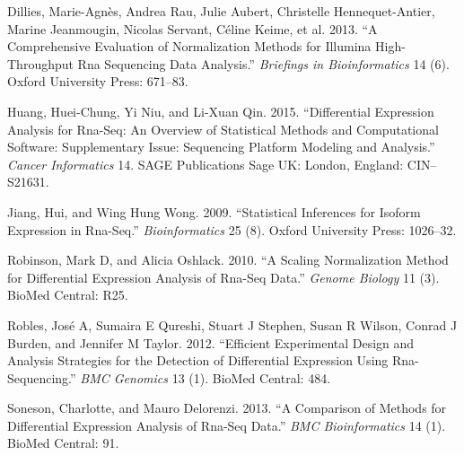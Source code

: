 \documentclass[]{article}
\begin{document}
\leavevmode\hypertarget{ref-dillies2013comprehensive}{}%
Dillies, Marie-Agnès, Andrea Rau, Julie Aubert, Christelle
Hennequet-Antier, Marine Jeanmougin, Nicolas Servant, Céline Keime, et
al. 2013. ``A Comprehensive Evaluation of Normalization Methods for
Illumina High-Throughput Rna Sequencing Data Analysis.'' \emph{Briefings
in Bioinformatics} 14 (6). Oxford University Press: 671--83.

\leavevmode\hypertarget{ref-huang2015differential}{}%
Huang, Huei-Chung, Yi Niu, and Li-Xuan Qin. 2015. ``Differential
Expression Analysis for Rna-Seq: An Overview of Statistical Methods and
Computational Software: Supplementary Issue: Sequencing Platform
Modeling and Analysis.'' \emph{Cancer Informatics} 14. SAGE Publications
Sage UK: London, England: CIN--S21631.

\leavevmode\hypertarget{ref-jiang2009statistical}{}%
Jiang, Hui, and Wing Hung Wong. 2009. ``Statistical Inferences for
Isoform Expression in Rna-Seq.'' \emph{Bioinformatics} 25 (8). Oxford
University Press: 1026--32.

\leavevmode\hypertarget{ref-robinson2010scaling}{}%
Robinson, Mark D, and Alicia Oshlack. 2010. ``A Scaling Normalization
Method for Differential Expression Analysis of Rna-Seq Data.''
\emph{Genome Biology} 11 (3). BioMed Central: R25.

\leavevmode\hypertarget{ref-robles2012efficient}{}%
Robles, José A, Sumaira E Qureshi, Stuart J Stephen, Susan R Wilson,
Conrad J Burden, and Jennifer M Taylor. 2012. ``Efficient Experimental
Design and Analysis Strategies for the Detection of Differential
Expression Using Rna-Sequencing.'' \emph{BMC Genomics} 13 (1). BioMed
Central: 484.

\leavevmode\hypertarget{ref-soneson2013comparison}{}%
Soneson, Charlotte, and Mauro Delorenzi. 2013. ``A Comparison of Methods
for Differential Expression Analysis of Rna-Seq Data.'' \emph{BMC
Bioinformatics} 14 (1). BioMed Central: 91.
\end{document}
